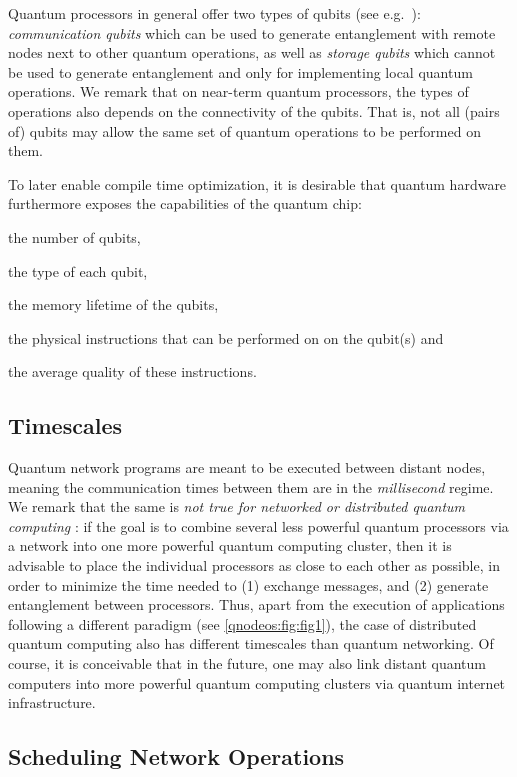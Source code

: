 Quantum processors in general offer two types of qubits (see e.g.~\cite{dahlberg_2019_egp}): \emph{communication qubits} which can be used to generate entanglement with remote nodes next to other quantum operations, as well as \emph{storage qubits} which cannot be used to generate entanglement and only for implementing local quantum operations. We remark that on near-term quantum processors, the types of operations also depends on the connectivity of the qubits. That is, not all (pairs of) qubits may allow the same set of quantum operations to be performed on them.

To later enable compile time optimization, it is desirable that quantum hardware furthermore exposes the capabilities of the quantum chip:
%
\begin{inlinelist}
\item the number of qubits,
\item the type of each qubit, 
\item the memory lifetime of the qubits,
\item the physical instructions that can be performed on on the qubit(s) and
\item the average quality of these instructions.
\end{inlinelist}

\subsection{Timescales}

Quantum network programs are meant to be executed between distant nodes, meaning the communication times between them are in the \emph{millisecond} regime. We remark that the same is \emph{not true for networked or distributed quantum computing }: if the goal is to combine several less powerful quantum processors via a network into one more powerful quantum computing cluster, then it is advisable to place the individual processors as close to each other as possible, in order to minimize the time needed to (1) exchange messages, and (2) generate entanglement between processors. Thus, apart from the execution of applications following a different paradigm (see \cref{qnodeos:fig:fig1}),
the case of distributed quantum computing also has different timescales than quantum networking. Of course, it is conceivable that in the future, one may also link distant quantum computers into more powerful quantum computing clusters via quantum internet infrastructure.


\subsection{Scheduling Network Operations}

